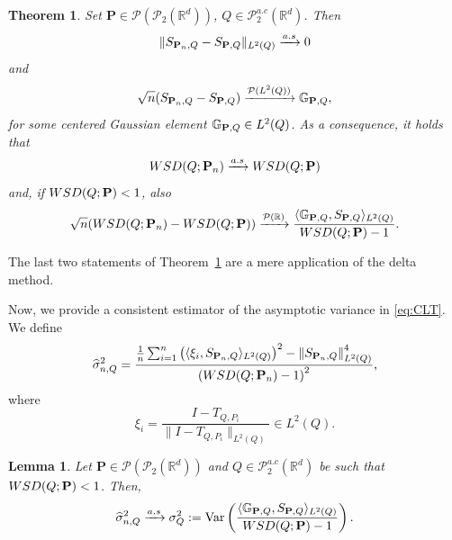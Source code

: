 \documentclass{imsart}
\newtheorem {Lemma}[Proposition] {Lemma}
\newtheorem {Theorem}[Proposition]{Theorem}
\numberwithin{equation}{section}
\def\R{\mathbb{R}}
\def\Var{\operatorname{Var}}
\begin{document}
\begin{Theorem}\label{Theorem:Glivenk}
	Set  $\mathbf{P}\in \mathcal{P}(\mathcal{P}_2(\R^d)) $, $Q\in \mathcal{P}^{a.c}_2(\R^d) $. Then 
	\begin{equation} \label{eq:LLN:one}
		\|S_{{\bf P}_n,Q } -S_{{\bf P},Q }\|_{L^2(Q)} \xrightarrow{a.s} 0 
	\end{equation}
	and 
	$$ \sqrt{n}(S_{{\bf P}_n,Q } -S_{{\bf P},Q }) \xrightarrow{\mathcal{P}(L^2(Q))}\mathbb{G}_{{\bf P},Q}, $$
	for some centered Gaussian element $\mathbb{G}_{{\bf P},Q}\in L^2(Q) $. 
	As a consequence, it holds that
	\begin{equation} \label{eq:LLN:two}
		{\rm WSD}(Q; {\bf P}_n )\xrightarrow{a.s}  {\rm WSD}(Q; {\bf P} )
	\end{equation}
	and, if $ {\rm WSD}(Q; {\bf P} )<1$,  also
	\begin{equation} \label{eq:CLT}
		\sqrt{n}( {\rm WSD}(Q; {\bf P}_n )- {\rm WSD}(Q; {\bf P} ))\xrightarrow{\mathcal{P}(\mathbb{R})} \frac{\langle \mathbb{G}_{{\bf P},Q}, S_{{\bf P},Q } \rangle_{L^2(Q)} }{ {\rm WSD}(Q; {\bf P} )-1}. 
	\end{equation}
\end{Theorem}
The last two statements of Theorem~\ref{Theorem:Glivenk} are a mere application of the delta method.

Now, we provide a consistent estimator of the asymptotic variance in \eqref{eq:CLT}. We define
\[
\widehat{\sigma}_{n,Q}^2
=
\frac{
	\frac{1}{n}\sum_{i=1}^n
	\left( 
	\langle
	\xi_i
	,
	S_{{\bf P}_n,Q }
	\rangle_{L^2(Q)}
	\right)^2
	-
	\left\| 
	S_{{\bf P}_n,Q }
	\right\|_{L^2(Q)}^4
}{
	\left(
	{\rm WSD}(Q; {\bf P}_n ) - 1
	\right)^2
},
\]
where
\[
\xi_i = 
\frac{I-T_{Q,P_i} }{\|I-T_{Q,P_i}\|_{L^2(Q)}}
\in L^2(Q).
\]



\begin{Lemma} \label{lem:asympt:var:CLT}
	Let  $\mathbf{P}\in \mathcal{P}(\mathcal{P}_2(\R^d)) $ and $Q\in \mathcal{P}^{a.c}_2(\R^d) $ be such that $ {\rm WSD}(Q; {\bf P} )<1$. Then, 
	\[
	\widehat{\sigma}_{n,Q}^2
	\xrightarrow{a.s} 
	\sigma_{Q}^2
	: = 
	\Var
	\left( 
	\frac{\langle \mathbb{G}_{{\bf P},Q}, S_{{\bf P},Q } \rangle_{L^2(Q)} }{ {\rm WSD}(Q; {\bf P} )-1}
	\right).
	\]
\end{Lemma} 
\end{document}
